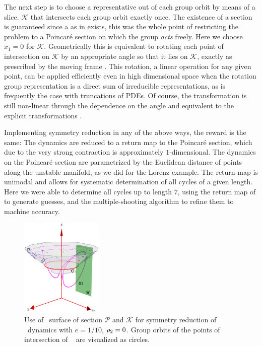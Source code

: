 The next step is to choose a representative out of each group
orbit by means of a slice. $\mathcal{K}$ that
intersects each group orbit exactly once. The existence of a
section is guaranteed since a {\csection} as in
 exists, this was the whole point of
restricting the problem to a Poincar\'e section on which the
group \emph{acts} freely. Here we choose $x_1=0$ for
$\mathcal{K}$. Geometrically this is equivalent to rotating
each point of intersection on $\mathcal{K}$ by an appropriate
angle so that it lies on $\mathcal{K}$, exactly as prescribed
by the moving frame . This rotation, a linear
operation for any given point, can be applied efficiently
even in high dimensional space when the rotation group
representation is a direct sum of irreducible
representations, as is frequently the case with truncations
of PDEs. Of course, the transformation is still non-linear
through the dependence on the angle and equivalent to the
explicit transformations .

Implementing symmetry reduction in any of the above ways, the
reward is the same: The dynamics are reduced to a return map
to the Poincar\'e section, which due to the very strong
contraction is approximately $1$-dimensional. The dynamics on
the Poincar\'e section are parametrized by the Euclidean
distance of points along the unstable manifold, as we did for
the Lorenz example. The return map is unimodal and allows for
systematic determination of all cycles of a given length.
Here we were able to determine all cycles up to length $7$,
using the return map of  to generate
guesses, and the multiple-shooting algorithm
to refine them to machine accuracy.

\begin{figure}[ht]
\begin{center}
  \includegraphics[width=0.35\textwidth]{../figs/CLEmartini}
\end{center}
\caption{
Use of \Poincare\ surface of section $\mathcal{P}$ and
{\csection} $\mathcal{K}$ for symmetry reduction of \CLe\
dynamics with $e=1/10$, $\rho_2=0$. Group orbits of the
points of intersection of \rpo\  are visualized as
circles.
    }
\label{fig:CLEmartini}
\end{figure}


